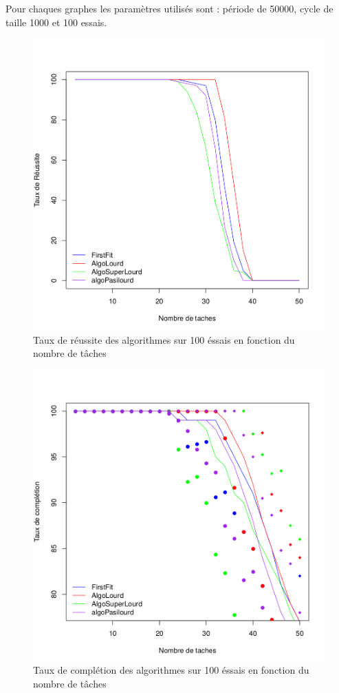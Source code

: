 \documentclass[11pt]{article}
\begin{document}
\newpage
Pour chaques graphes les paramètres utilisés sont : période de 50000, cycle de taille 1000 et 100 essais.
\begin{figure}[!ht]
    \center
    \includegraphics[scale = 0.4]{taux_reussite}
    \caption{Taux de réussite des algorithmes sur 100 éssais en fonction du nombre de tâches}
\end{figure} 

\begin{figure}[!ht]
    \center
    \includegraphics[scale = 0.4]{taux_completion}
    \caption{Taux de complétion des algorithmes sur 100 éssais en fonction du nombre de tâches}
\end{figure}
\end{document}
